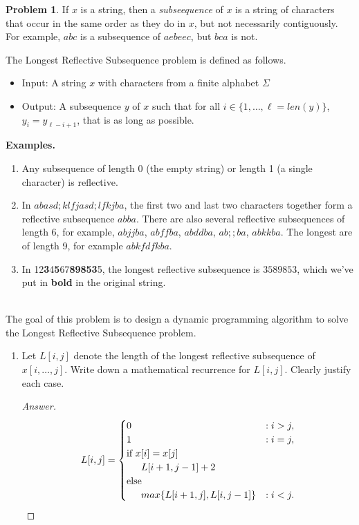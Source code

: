 \documentclass[11pt]{article}
\theoremstyle{definition}
\theoremstyle{definition}
\newtheorem{required}{Problem}
\theoremstyle{definition}
\begin{document}
\begin{required}
If $x$ is a string, then a \emph{subseequence} of $x$ is a string of characters that occur in the same order as they do in $x$, but not necessarily contiguously. For example, $abc$ is a subsequence of $aebeec$, but $bca$ is not.

The \textsf{Longest Reflective Subsequence} problem is defined as follows.
\begin{itemize}
\item \textsf{Input:} A string $x$ with characters from a finite alphabet $\Sigma$
\item \textsf{Output:} A subsequence $y$ of $x$ such that for all $i \in \{1, \ldots, \ell=len(y)\}$, $y_{i} = y_{\ell - i + 1}$, that is as long as possible.
\end{itemize}

\textbf{Examples.} 
\begin{enumerate}
\item Any subsequence of length 0 (the empty string) or length 1 (a single character) is reflective.

\item In $abasd;klfjasd;lfkjba$, the first two and last two characters together form a reflective subsequence $abba$. There are also several reflective subsequences of length 6, for example, $abjjba$, $abffba$, $abddba$, $ab;;ba$, $abkkba$. The longest are of length 9, for example $abkfdfkba$.

\item In 12\textbf{3}4\textbf{5}67\textbf{89853}5, the longest reflective subsequence is $3589853$, which we've put in \textbf{bold} in the original string.
\end{enumerate}


\noindent \\ The goal of this problem is to design a dynamic programming algorithm to solve the \textsf{Longest Reflective Subsequence} problem.

\begin{enumerate}[label=(\alph*)]
        \subsection{Problem 25\ref{2a} (1 Point)}
\item \label{2a} Let $L[i, j]$ denote the length of the longest reflective subsequence of $x[i, \ldots, j]$. Write down a mathematical recurrence for $L[i, j]$. Clearly justify each case.

\begin{proof}[Answer]
\begin{align*}
	L[i, j]= \begin{cases}
		0 & : i > j, \\
		1 & : i = j, \\
		\text{if } x[i] = x[j]\\
			\indent L[i + 1, j - 1] + 2\\
		\text{else}\\
			\indent max\{L[i + 1, j], L[i, j - 1]\} &: i < j.\\
	\end{cases}
\end{align*}


\end{proof}
\end{enumerate}
\end{required}
\end{document}
